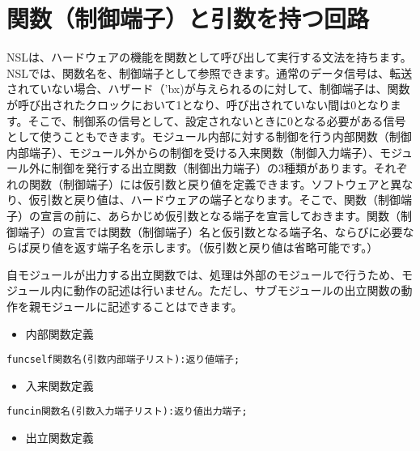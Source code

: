 \chapter{関数（制御端子）と引数を持つ回路}
\label{chap:function}

NSLは、ハードウェアの機能を関数として呼び出して実行する文法を持ちます。 NSLでは、関数名を、制御端子として参照できます。通常のデータ信号は、転送されていない場合、ハザード（'bx)が与えられるのに対して、制御端子は、関数が呼び出されたクロックにおいて1となり、呼び出されていない間は0となります。そこで、制御系の信号として、設定されないときに0となる必要がある信号として使うこともできます。モジュール内部に対する制御を行う内部関数（制御内部端子）、モジュール外からの制御を受ける入来関数（制御入力端子）、モジュール外に制御を発行する出立関数（制御出力端子）の3種類があります。それぞれの関数（制御端子）には仮引数と戻り値を定義できます。ソフトウェアと異なり、仮引数と戻り値は、ハードウェアの端子となります。そこで、関数（制御端子）の宣言の前に、あらかじめ仮引数となる端子を宣言しておきます。関数（制御端子）の宣言では関数（制御端子）名と仮引数となる端子名、ならびに必要ならば戻り値を返す端子名を示します。（仮引数と戻り値は省略可能です。）

自モジュールが出力する出立関数では、処理は外部のモジュールで行うため、モジュール内に動作の記述は行いません。ただし、サブモジュールの出立関数の動作を親モジュールに記述することはできます。

\begin{itemize}
\item 内部関数定義
\end{itemize}

\begin{reviewemlist}
\begin{alltt}
func\textunderscore{}self 関数名(引数内部端子リスト)  : 返り値端子 ;
\end{alltt}
\end{reviewemlist}

\begin{itemize}
\item 入来関数定義
\end{itemize}

\begin{reviewemlist}
\begin{alltt}
func\textunderscore{}in 関数名(引数入力端子リスト)  : 返り値出力端子 ;
\end{alltt}
\end{reviewemlist}

\begin{itemize}
\item 出立関数定義
\end{itemize}

